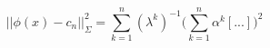 \documentclass[preprint,12pt]{elsarticle}
\begin{document}
\begin{equation}
	||\phi(x) - c_n||^2_{\Sigma} = \sum_{k=1}^{n} (\lambda^k)^{-1} \big( \sum_{k=1}^{n} \alpha^k [...]    \big)^2
\end{equation}	
%
%
%
%
\end{document}

